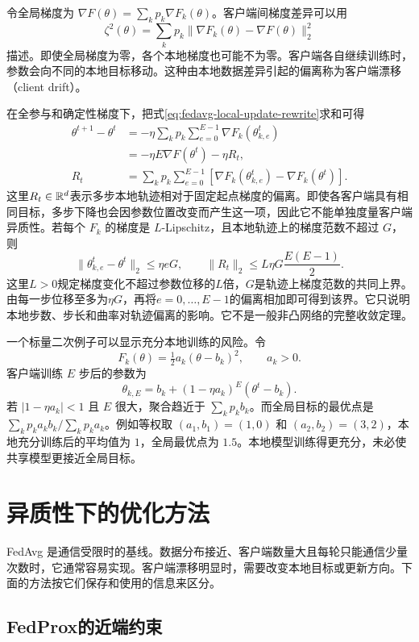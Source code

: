 令全局梯度为 $\nabla F(\theta)=\sum_kp_k\nabla F_k(\theta)$。客户端间梯度差异可以用
\begin{equation}
 \zeta^2(\theta)=\sum_kp_k\|\nabla F_k(\theta)-\nabla F(\theta)\|_2^2
\end{equation}
描述。即使全局梯度为零，各个本地梯度也可能不为零。客户端各自继续训练时，参数会向不同的本地目标移动。这种由本地数据差异引起的偏离称为客户端漂移（client drift）。

在全参与和确定性梯度下，把式\eqref{eq:fedavg-local-update-rewrite}求和可得
\begin{align}
 \theta^{t+1}-\theta^t
 &=-\eta\sum_kp_k\sum_{e=0}^{E-1}\nabla F_k(\theta_{k,e}^t)\\
 &=-\eta E\nabla F(\theta^t)-\eta R_t,\\
 R_t&=\sum_kp_k\sum_{e=0}^{E-1}
 [\nabla F_k(\theta_{k,e}^t)-\nabla F_k(\theta^t)].
 \label{eq:fed-drift-decomposition-rewrite}
\end{align}
这里$R_t\in\mathbb{R}^d$表示多步本地轨迹相对于固定起点梯度的偏离。即使各客户端具有相同目标，多步下降也会因参数位置改变而产生这一项，因此它不能单独度量客户端异质性。若每个 $F_k$ 的梯度是 $L$-Lipschitz，且本地轨迹上的梯度范数不超过 $G$，则
\[
 \|\theta_{k,e}^t-\theta^t\|_2\leq\eta eG,
 \qquad
 \|R_t\|_2\leq L\eta G\frac{E(E-1)}2.
\]
这里$L>0$规定梯度变化不超过参数位移的$L$倍，$G$是轨迹上梯度范数的共同上界。由每一步位移至多为$\eta G$，再将$e=0,\ldots,E-1$的偏离相加即可得到该界。它只说明本地步数、步长和曲率对轨迹偏离的影响。它不是一般非凸网络的完整收敛定理。

一个标量二次例子可以显示充分本地训练的风险。令
\[
 F_k(\theta)=\tfrac12a_k(\theta-b_k)^2,
 \qquad a_k>0.
\]
客户端训练 $E$ 步后的参数为
\[
 \theta_{k,E}=b_k+(1-\eta a_k)^E(\theta^t-b_k).
\]
若 $|1-\eta a_k|<1$ 且 $E$ 很大，聚合趋近于 $\sum_kp_kb_k$。而全局目标的最优点是 $\sum_kp_ka_kb_k/\sum_kp_ka_k$。例如等权取 $(a_1,b_1)=(1,0)$ 和 $(a_2,b_2)=(3,2)$，本地充分训练后的平均值为 $1$，全局最优点为 $1.5$。本地模型训练得更充分，未必使共享模型更接近全局目标。

\section{异质性下的优化方法}

FedAvg 是通信受限时的基线。数据分布接近、客户端数量大且每轮只能通信少量次数时，它通常容易实现。客户端漂移明显时，需要改变本地目标或更新方向。下面的方法按它们保存和使用的信息来区分。

\subsection{FedProx的近端约束}

